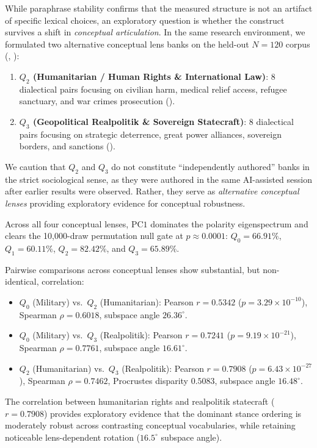 While paraphrase stability confirms that the measured structure is not an artifact of specific lexical choices, an exploratory question is whether the construct survives a shift in \emph{conceptual articulation}. In the same research environment, we formulated two alternative conceptual lens banks on the held-out $N=120$ corpus (, ):
\begin{enumerate}
    \item \textbf{$Q_2$ (Humanitarian / Human Rights \& International Law)}: 8 dialectical pairs focusing on civilian harm, medical relief access, refugee sanctuary, and war crimes prosecution ().
    \item \textbf{$Q_3$ (Geopolitical Realpolitik \& Sovereign Statecraft)}: 8 dialectical pairs focusing on strategic deterrence, great power alliances, sovereign borders, and sanctions ().
\end{enumerate}
We caution that $Q_2$ and $Q_3$ do not constitute ``independently authored'' banks in the strict sociological sense, as they were authored in the same AI-assisted session after earlier results were observed. Rather, they serve as \emph{alternative conceptual lenses} providing exploratory evidence for conceptual robustness.

Across all four conceptual lenses, $\mathrm{PC1}$ dominates the polarity eigenspectrum and clears the 10,000-draw permutation null gate at $p \approx 0.0001$: $Q_0 = 66.91\%$, $Q_1 = 60.11\%$, $Q_2 = 82.42\%$, and $Q_3 = 65.89\%$. 

Pairwise comparisons across conceptual lenses show substantial, but non-identical, correlation:
\begin{itemize}
    \item $Q_0$ (Military) vs.\ $Q_2$ (Humanitarian): Pearson $r = 0.5342$ ($p = 3.29 \times 10^{-10}$), Spearman $\rho = 0.6018$, subspace angle $26.36^\circ$.
    \item $Q_0$ (Military) vs.\ $Q_3$ (Realpolitik): Pearson $r = 0.7241$ ($p = 9.19 \times 10^{-21}$), Spearman $\rho = 0.7761$, subspace angle $16.61^\circ$.
    \item $Q_2$ (Humanitarian) vs.\ $Q_3$ (Realpolitik): Pearson $r = 0.7908$ ($p = 6.43 \times 10^{-27}$), Spearman $\rho = 0.7462$, Procrustes disparity $0.5083$, subspace angle $16.48^\circ$.
\end{itemize}
The correlation between humanitarian rights and realpolitik statecraft ($r = 0.7908$) provides exploratory evidence that the dominant stance ordering is moderately robust across contrasting conceptual vocabularies, while retaining noticeable lens-dependent rotation ($16.5^\circ$ subspace angle).



